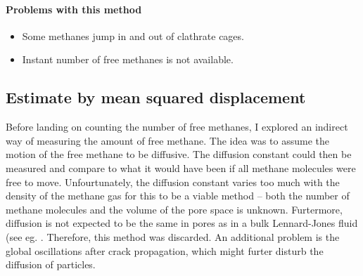 \paragraph{Problems with this method}
\begin{itemize}
\item Some methanes jump in and out of clathrate cages. 
\item Instant number of free methanes is not available.
\end{itemize}

\subsection{Estimate by mean squared displacement}
Before landing on counting the number of free methanes, I explored an indirect way of measuring the amount of free methane. The idea was to assume the motion of the free methane to be diffusive. The diffusion constant could then be measured and compare to what it would have been if all methane molecules were free to move. Unfourtunately, the diffusion constant varies too much with the density of the methane gas for this to be a viable method -- both the number of methane molecules and the volume of the pore space is unknown. Furtermore, diffusion is not expected to be the same in pores as in a bulk Lennard-Jones fluid (see eg. \citet[p. 18]{Pozhar:1668293}. Therefore, this method was discarded. An additional problem is the global oscillations after crack propagation, which might furter disturb the diffusion of particles. 

